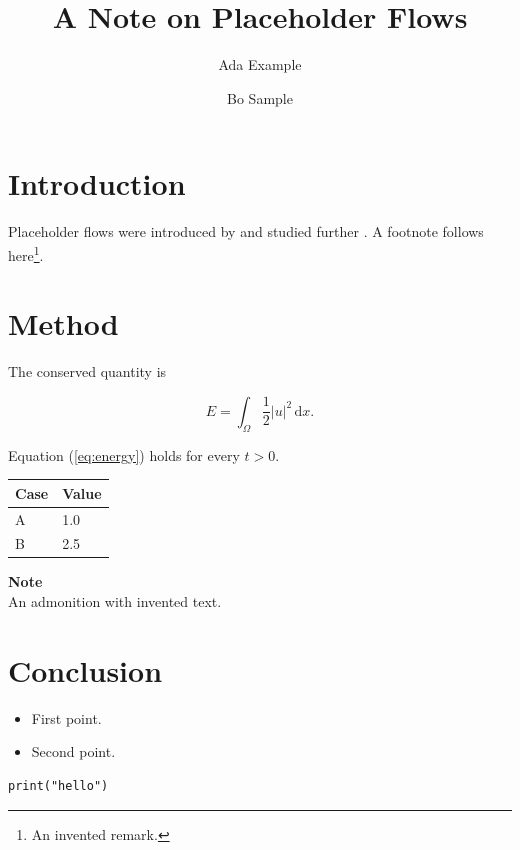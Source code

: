 \documentclass[twocolumn, switch]{article}
\title{A Note on Placeholder Flows}
\author[1\thanks{\texttt{ada@example.org}}]{Ada Example}
\author[2]{Bo Sample}
\affil[1]{Example Institute}
\affil[2]{Sample University}
\begin{document}


\section{Introduction}

Placeholder flows were introduced by \cite{doe2020} and studied further \citep{doe2020}.
A footnote follows here\footnote{An invented remark.}.

\section{Method}

The conserved quantity is

\begin{equation}
\label{eq:energy}
E = \int_\Omega \frac{1}{2} |u|^2 \, \mathrm{d}x .
\end{equation}

Equation (\ref{eq:energy}) holds for every $t > 0$.

\bigskip\noindent
\begin{tabular}{p{}p{}}
\toprule
Case & Value \\
\hline
A & 1.0 \\
B & 2.5 \\
\bottomrule
\end{tabular}

\bigskip

\begin{framed}
\textbf{Note}\\
An admonition with invented text.
\end{framed}

\section{Conclusion}

\begin{itemize}
\item First point.
\item Second point.
\end{itemize}

\begin{verbatim}
print("hello")
\end{verbatim}




\end{document}

